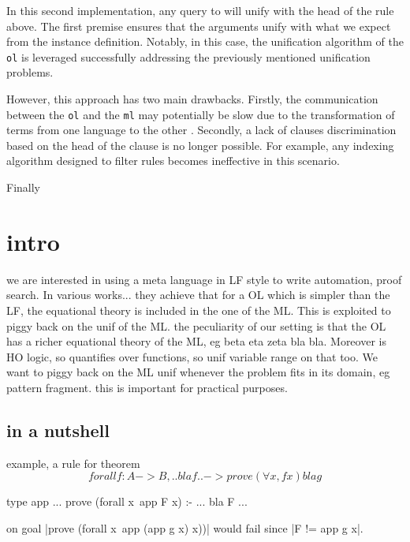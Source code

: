 \documentclass[sigconf,natbib=false]{acmart}
\newcommand*{\acronym}[1]{\texttt{#1}\xspace}
\def\ol{\acronym{ol}} %
\def\ml{\acronym{ml}} %
\begin{document}
\noindent In this second implementation, any query to 
will unify with the head of the rule above. The first
premise ensures that the arguments unify with what we expect from the
instance definition. Notably, in this case, the unification algorithm of
the \ol is leveraged successfully addressing the previously mentioned unification problems.

However, this approach has two main drawbacks. Firstly, the communication
between the \ol and the \ml may potentially be slow due to the transformation of
terms from one language to the other . Secondly, a lack of %
clauses discrimination based on the head of the clause is no longer
possible. For example, any indexing
algorithm designed to filter rules becomes ineffective in this scenario.

Finally 




  
\section{intro}

we are interested in using a meta language in LF style to write
automation, proof search. In various works... they achieve that
for a OL which is simpler than the LF, the equational theory is included
in the one of the ML. This is exploited to piggy back on the unif
of the ML.
the peculiarity of our setting is that the OL has a richer equational
theory of the ML, eg beta eta zeta bla bla. Moreover is HO logic, so
quantifies over functions, so unif variable range on that too.
We want to piggy back on the ML unif whenever the problem fits
in its domain, eg pattern fragment.
this is important for practical purposes.

\subsection{in a nutshell}
example, a rule for theorem
$$
forall f : A -> B, .. bla f .. -> prove (\forall x, f x)
bla g
$$
\begin{elpicode}
type app ...
prove (forall x\ app F x) :- ... bla F ...
\end{elpicode}
on goal |prove (forall x\ app (app g x) x))|
would fail since |F != app g x|.
\end{document}
